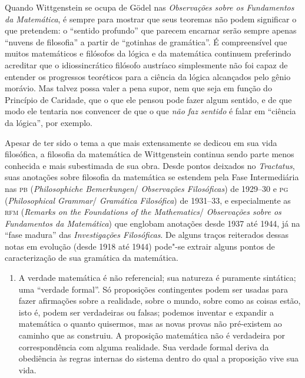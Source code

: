 {Quando Wittgenstein se ocupa de Gödel nas \emph{Observações
sobre os Fundamentos da Matemática}, é sempre para mostrar que
seus teoremas não podem significar o que pretendem: o
``sentido profundo'' que parecem
encarnar serão sempre apenas “nuvens de filosofia” a partir de
“gotinhas de gramática”. É compreensível que muitos matemáticos
e filósofos da lógica e da matemática continuem preferindo
acreditar que o idiossincrático filósofo austríaco simplesmente
não foi capaz de entender os progressos teoréticos para a
ciência da lógica alcançados pelo gênio morávio. Mas talvez
possa valer a pena supor, nem que seja em função do Princípio de
Caridade, que o que ele pensou pode fazer algum sentido, e de
que modo ele tentaria nos convencer de que o que \emph{não faz
sentido} é falar em ``ciência da
lógica'', por exemplo.

Apesar de ter sido o tema a que mais extensamente se dedicou
em sua vida filosófica, a filosofia da matemática de
Wittgenstein continua sendo parte menos conhecida e mais
subestimada de sua obra. Desde pontos deixados no
\emph{Tractatus}, suas anotações sobre filosofia da matemática
se estendem pela Fase Intermediária nas \textsc{pb}
(\emph{Philosophiche Bemerkungen}/ \emph{Observações
Filosóficas}) de 1929--30 e \textsc{pg} (\emph{Philosophical
Grammar}/ \emph{Gramática Filosófica}) de 1931--33, e
especialmente as \textsc{rfm} (\emph{Remarks on the Foundations of the
Mathematics}/ \emph{Observações sobre os Fundamentos da
Matemática}) que englobam anotações desde 1937 até 1944, já na
``fase madura'' das \emph{Investigações
Filosóficas}. De alguns traços reiterados dessas notas em
evolução (desde 1918 até 1944) pode"-se extrair alguns pontos de
caracterização de sua gramática da matemática.

\begin{enumerate}
\item A verdade matemática é não referencial; sua natureza é
puramente sintática; uma ``verdade formal''. Só proposições
contingentes podem ser usadas para fazer afirmações sobre a
realidade, sobre o mundo, sobre como as coisas estão, isto é,
podem ser verdadeiras ou falsas; podemos inventar e expandir a
matemática o quanto quisermos, mas as novas provas não
pré-existem ao caminho que as construiu. A proposição matemática
não é verdadeira por correspondência com alguma realidade. Sua
verdade formal deriva da obediência às regras internas do
sistema dentro do qual a proposição vive sua vida.


\end{enumerate}}
